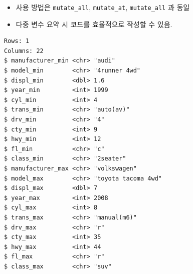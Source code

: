 \documentclass[
  11pt,
]{krantz}
\makeatletter
\newenvironment{Shaded}{\begin{snugshade}}{\end{snugshade}}
\newcommand{\CommentTok}[1]{\textcolor[rgb]{0.37,0.37,0.37}{\textit{#1}}}
\newcommand{\DataTypeTok}[1]{\textcolor[rgb]{0.27,0.27,0.27}{#1}}
\newcommand{\KeywordTok}[1]{\textcolor[rgb]{0.27,0.27,0.27}{\textbf{#1}}}
\newcommand{\NormalTok}[1]{#1}
\newcommand{\OperatorTok}[1]{\textcolor[rgb]{0.43,0.43,0.43}{\textbf{#1}}}
\newcommand{\StringTok}[1]{\textcolor[rgb]{0.5,0.5,0.5}{#1}}
\providecommand{\tightlist}{%
  \setlength{\itemsep}{0pt}\setlength{\parskip}{0pt}}
\newenvironment{kframe}{%
\medskip{}
\setlength{\fboxsep}{.8em}
 \def\at@end@of@kframe{}%
 \ifinner\ifhmode%
  \def\at@end@of@kframe{\end{minipage}}%
  \begin{minipage}{\columnwidth}%
 \fi\fi%
 \def\FrameCommand##1{\hskip\@totalleftmargin \hskip-\fboxsep
 \colorbox{shadecolor}{##1}\hskip-\fboxsep
     \hskip-\linewidth \hskip-\@totalleftmargin \hskip\columnwidth}%
 \MakeFramed {\advance\hsize-\width
   \@totalleftmargin\z@ \linewidth\hsize
   \@setminipage}}%
 {\par\unskip\endMakeFramed%
 \at@end@of@kframe}
\renewenvironment{quote}{\begin{kframe}}{\end{kframe}}
\makeatother
\begin{document}
\begin{quote}
\begin{itemize}
\tightlist
\item
  사용 방법은 \texttt{mutate\_all}, \texttt{mutate\_at}, \texttt{mutate\_all} 과 동일
\item
  다중 변수 요약 시 코드를 효율적으로 작성할 수 있음.
\end{itemize}
\end{quote}

\footnotesize

\begin{Shaded}
\end{Shaded}

\begin{verbatim}
Rows: 1
Columns: 22
$ manufacturer_min <chr> "audi"
$ model_min        <chr> "4runner 4wd"
$ displ_min        <dbl> 1.6
$ year_min         <int> 1999
$ cyl_min          <int> 4
$ trans_min        <chr> "auto(av)"
$ drv_min          <chr> "4"
$ cty_min          <int> 9
$ hwy_min          <int> 12
$ fl_min           <chr> "c"
$ class_min        <chr> "2seater"
$ manufacturer_max <chr> "volkswagen"
$ model_max        <chr> "toyota tacoma 4wd"
$ displ_max        <dbl> 7
$ year_max         <int> 2008
$ cyl_max          <int> 8
$ trans_max        <chr> "manual(m6)"
$ drv_max          <chr> "r"
$ cty_max          <int> 35
$ hwy_max          <int> 44
$ fl_max           <chr> "r"
$ class_max        <chr> "suv"
\end{verbatim}

\begin{Shaded}
\end{Shaded}
\end{document}
